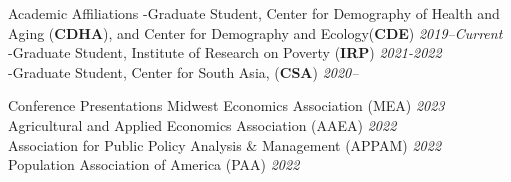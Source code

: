 \documentclass{resume} %
\begin{document}
\begin{rSection}{Academic Affiliations}
-Graduate Student, Center for Demography of Health and Aging (\textbf{CDHA}), and Center for Demography and Ecology(\textbf{CDE})
 \hfill \textit{2019--Current}\\
-Graduate Student, Institute of Research on Poverty (\textbf{IRP})%
 \hfill \textit{2021-2022}\\
 -Graduate Student, Center for South Asia, (\textbf{CSA})%
 \hfill \textit{2020--}
\end{rSection}




\begin{rSection}{Conference Presentations} 
	Midwest Economics Association (MEA) {\hfill \em 2023}\\
	Agricultural and Applied Economics Association (AAEA) {\hfill \em 2022}\\
	Association for Public Policy Analysis \& Management (APPAM) {\hfill \em 2022} \\
	Population Association of America (PAA) {\hfill \em 2022}






	
	
	
	
	
	
\end{rSection}
	
\end{document}
